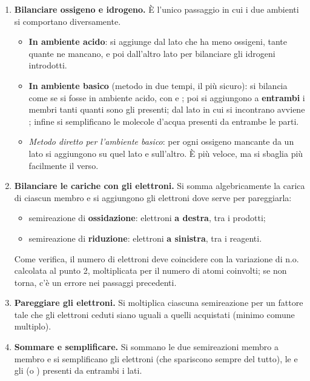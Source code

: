 \documentclass[11pt, a4paper, openright]{book}
\begin{document}
\begin{enumerate}
    \item \textbf{Bilanciare ossigeno e idrogeno.} È l'unico passaggio in cui i due ambienti si comportano diversamente.
    \begin{itemize}
        \item \textbf{In ambiente acido}: si aggiunge  dal lato che ha meno ossigeni, tante quante ne mancano, e poi  dall'altro lato per bilanciare gli idrogeni introdotti.
        \item \textbf{In ambiente basico} (metodo in due tempi, il più sicuro): si bilancia come se si fosse in ambiente acido, con  e ; poi si aggiungono a \textbf{entrambi} i membri tanti  quanti sono gli  presenti; dal lato in cui si incontrano avviene ; infine si semplificano le molecole d'acqua presenti da entrambe le parti.
        \item \textit{Metodo diretto per l'ambiente basico}: per ogni ossigeno mancante da un lato si aggiungono  su quel lato e  sull'altro. È più veloce, ma si sbaglia più facilmente il verso.
    \end{itemize}

    \item \textbf{Bilanciare le cariche con gli elettroni.} Si somma algebricamente la carica di ciascun membro e si aggiungono gli elettroni dove serve per pareggiarla:
    \begin{itemize}
        \item semireazione di \textbf{ossidazione}: elettroni \textbf{a destra}, tra i prodotti;
        \item semireazione di \textbf{riduzione}: elettroni \textbf{a sinistra}, tra i reagenti.
    \end{itemize}
    Come verifica, il numero di elettroni deve coincidere con la variazione di n.o. calcolata al punto 2, moltiplicata per il numero di atomi coinvolti; se non torna, c'è un errore nei passaggi precedenti.

    \item \textbf{Pareggiare gli elettroni.} Si moltiplica ciascuna semireazione per un fattore tale che gli elettroni ceduti siano uguali a quelli acquistati (minimo comune multiplo).

    \item \textbf{Sommare e semplificare.} Si sommano le due semireazioni membro a membro e si semplificano gli elettroni (che spariscono sempre del tutto), le  e gli  (o ) presenti da entrambi i lati.


\end{enumerate}
\end{document}
